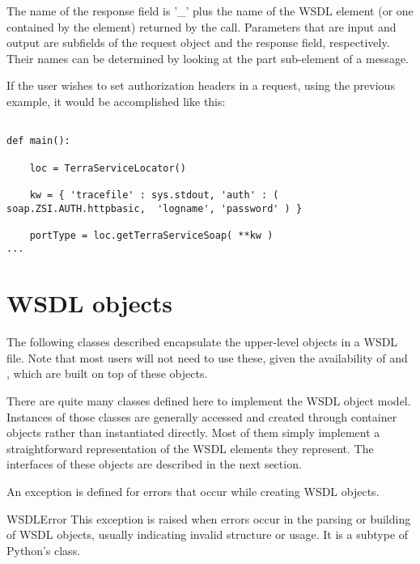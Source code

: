 The name of the response field is '_' plus the name of the
WSDL element (or one contained by the element) returned by the call.
Parameters that are input and output are subfields of
the request object and the response field, respectively. 
Their names can be determined by looking at the part sub-element of a
message.

If the user wishes to set authorization headers in a request, using the 
previous example, it would be accomplished like this:

\begin{verbatim}

def main():

    loc = TerraServiceLocator()

    kw = { 'tracefile' : sys.stdout, 'auth' : ( soap.ZSI.AUTH.httpbasic,  'logname', 'password' ) }

    portType = loc.getTerraServiceSoap( **kw ) 
...

\end{verbatim}

\section{WSDL objects}

The following classes described encapsulate the upper-level objects
in a WSDL file.  Note that most users will not need to use these,
given the availability of  and
, which are built on top of these objects.

There are quite many classes defined here to
implement the WSDL object model. Instances of those classes are generally 
accessed and created through container objects rather than instantiated 
directly. Most of them simply implement a straightforward representation of 
the WSDL elements they represent. The interfaces of these objects are 
described in the next section.

An exception is defined for errors that occur while creating WSDL objects.

\begin{excdesc}{WSDLError}
This exception is raised when errors occur in the parsing or building of 
WSDL objects, usually indicating invalid structure or usage.
It is a subtype of Python's  class.
\end{excdesc}

